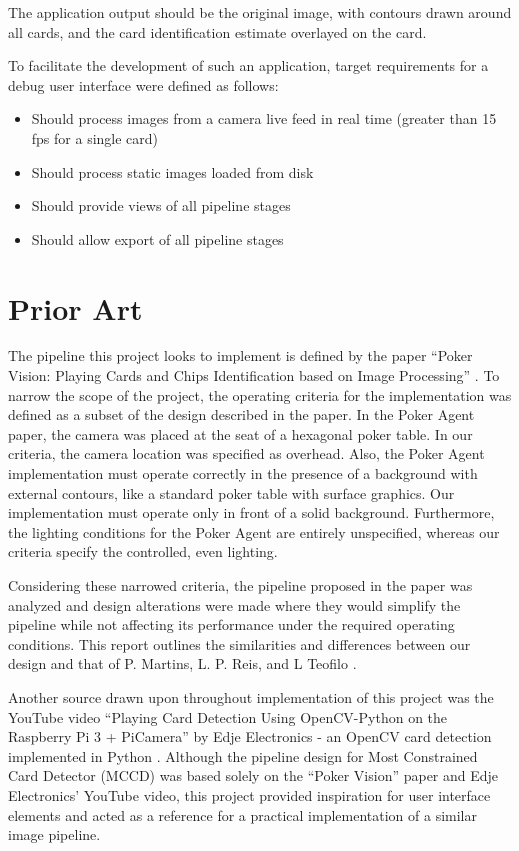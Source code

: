 \documentclass[conference]{IEEEtran}
\begin{document}
The application output should be the original image, with contours drawn around all cards, and the
card identification estimate overlayed on the card.

To facilitate the development of such an application, target requirements for a debug user interface
were defined as follows:
\begin{itemize}
    \item Should process images from a camera live feed in real time (greater than 15 fps for a
        single card)
    \item Should process static images loaded from disk
    \item Should provide views of all pipeline stages
    \item Should allow export of all pipeline stages
\end{itemize}

\section{Prior Art}
The pipeline this project looks to implement is defined by the paper ``Poker Vision: Playing Cards
and Chips Identification based on Image Processing'' \cite{poker-vision}. To narrow the scope of the
project, the operating criteria for the implementation was defined as a subset of the design
described in the paper. In the Poker Agent paper, the camera was placed at the seat of a hexagonal
poker table. In our criteria, the camera location was specified as overhead. Also, the Poker Agent
implementation must operate correctly in the presence of a background with external contours, like a
standard poker table with surface graphics. Our implementation must operate only in front of a solid
background. Furthermore, the lighting conditions for the Poker Agent are entirely unspecified,
whereas our criteria specify the controlled, even lighting.

Considering these narrowed criteria, the pipeline proposed in the paper was analyzed and design
alterations were made where they would simplify the pipeline while not affecting its performance
under the required operating conditions. This report outlines the similarities and differences
between our design and that of P. Martins, L. P. Reis, and L Teofilo \cite{poker-vision}.

Another source drawn upon throughout implementation of this project was the YouTube video ``Playing
Card Detection Using OpenCV-Python on the Raspberry Pi 3 + PiCamera'' by Edje Electronics - an
OpenCV card detection implemented in Python \cite{opencv-card-detection}. Although the pipeline
design for Most Constrained Card Detector (MCCD) was based solely on the ``Poker Vision'' paper and
Edje Electronics' YouTube video, this project provided inspiration for user interface elements and
acted as a reference for a practical implementation of a similar image pipeline.
\end{document}
